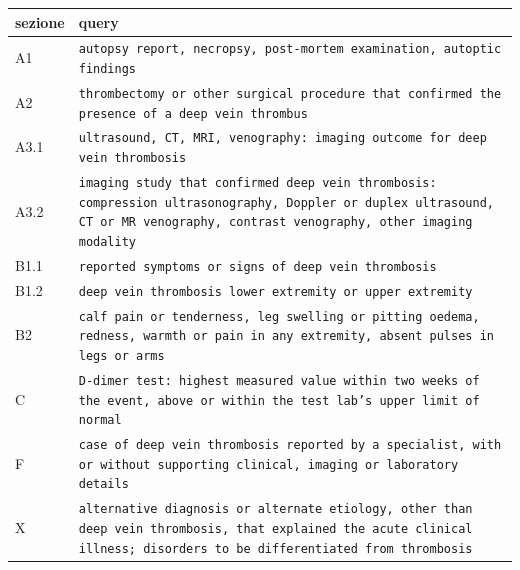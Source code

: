 \begin{tabular}{l p{9cm}}
\toprule
sezione & query \\
\midrule
A1 & \texttt{autopsy report, necropsy, post-mortem examination, autoptic findings} \\
A2 & \texttt{thrombectomy or other surgical procedure that confirmed the presence of a deep vein thrombus} \\
A3.1 & \texttt{ultrasound, CT, MRI, venography: imaging outcome for deep vein thrombosis} \\
A3.2 & \texttt{imaging study that confirmed deep vein thrombosis: compression ultrasonography, Doppler or duplex ultrasound, CT or MR venography, contrast venography, other imaging modality} \\
B1.1 & \texttt{reported symptoms or signs of deep vein thrombosis} \\
B1.2 & \texttt{deep vein thrombosis lower extremity or upper extremity} \\
B2 & \texttt{calf pain or tenderness, leg swelling or pitting oedema, redness, warmth or pain in any extremity, absent pulses in legs or arms} \\
C & \texttt{D-dimer test: highest measured value within two weeks of the event, above or within the test lab's upper limit of normal} \\
F & \texttt{case of deep vein thrombosis reported by a specialist, with or without supporting clinical, imaging or laboratory details} \\
X & \texttt{alternative diagnosis or alternate etiology, other than deep vein thrombosis, that explained the acute clinical illness; disorders to be differentiated from thrombosis} \\
\bottomrule
\end{tabular}
